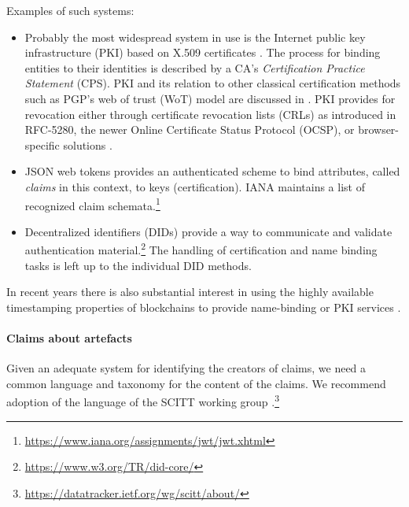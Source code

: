 Examples of such systems:
\begin{itemize}
  \item
    Probably the most widespread system in use is the Internet public key infrastructure (PKI) based on X.509 certificates \cite{rfc5280}.
    The process for binding entities to their identities is described by a CA's \emph{Certification Practice Statement} (CPS).
    PKI and its relation to other classical certification methods such as PGP's web of trust (WoT) model are discussed in \cite{gerck1997overview}.
    PKI provides for revocation either through certificate revocation lists (CRLs) as introduced in RFC-5280, the newer Online Certificate Status Protocol (OCSP), or browser-specific solutions \cite{crlsets}.

  \item 
    JSON web tokens \cite{rfc7519} provides an authenticated scheme to bind attributes, called \emph{claims} in this context, to keys (certification). 
    IANA maintains a list of recognized claim schemata.\footnote{\url{https://www.iana.org/assignments/jwt/jwt.xhtml}}

  \item
    Decentralized identifiers (DIDs) provide a way to communicate and validate authentication material.\footnote{\url{https://www.w3.org/TR/did-core/}}
    The handling of certification and name binding tasks is left up to the individual DID methods.

\end{itemize}
%
In recent years there is also substantial interest in using the highly available timestamping properties of blockchains to provide name-binding or PKI services \cite{eip137,tomsguide2023proton}.


\paragraph{Claims about artefacts} Given an adequate system for identifying the creators of claims, we need a common language and taxonomy for the content of the claims.
%
We recommend adoption of the language of the SCITT working group \cite{ietf-scitt-architecture-04}.\footnote{\url{https://datatracker.ietf.org/wg/scitt/about/}}

